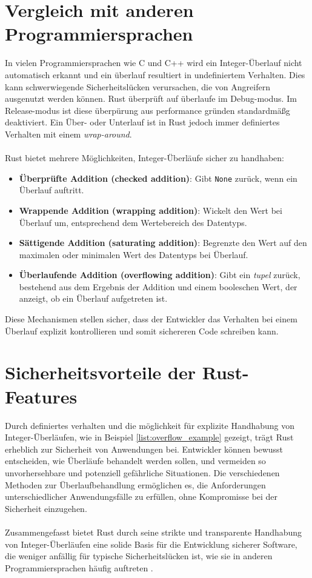 \section{Vergleich mit anderen Programmiersprachen}

In vielen Programmiersprachen wie C und C++ wird ein Integer-Überlauf nicht automatisch erkannt und ein überlauf resultiert in undefiniertem Verhalten. 
Dies kann schwerwiegende Sicherheitslücken verursachen, die von Angreifern ausgenutzt werden können.
Rust überprüft auf überlaufe im Debug-modus.
Im Release-modus ist diese überpürung aus performance gründen standardmäßg deaktiviert.
Ein Über- oder Unterlauf ist in Rust jedoch immer definiertes Verhalten mit einem \textit{\gls{wrap-around}}.\\
\\
Rust bietet mehrere Möglichkeiten, Integer-Überläufe sicher zu handhaben:

\begin{itemize}
    \item \textbf{Überprüfte Addition (checked addition)}: Gibt \texttt{None} zurück, wenn ein Überlauf auftritt.
    \item \textbf{Wrappende Addition (wrapping addition)}: Wickelt den Wert bei Überlauf um, entsprechend dem Wertebereich des Datentyps.
    \item \textbf{Sättigende Addition (saturating addition)}: Begrenzte den Wert auf den maximalen oder minimalen Wert des Datentyps bei Überlauf.
    \item \textbf{Überlaufende Addition (overflowing addition)}: Gibt ein \textit{\gls{tupel}} zurück, bestehend aus dem Ergebnis der Addition und einem booleschen Wert, der anzeigt, ob ein Überlauf aufgetreten ist.
\end{itemize}
\noindent
Diese Mechanismen stellen sicher, dass der Entwickler das Verhalten bei einem Überlauf explizit kontrollieren und somit sichereren Code schreiben kann.

\section{Sicherheitsvorteile der Rust-Features}

Durch definiertes verhalten und die möglichkeit für explizite Handhabung von Integer-Überläufen, wie in Beispiel \ref{list:overflow_example} gezeigt, trägt Rust erheblich zur Sicherheit von Anwendungen bei. 
Entwickler können bewusst entscheiden, wie Überläufe behandelt werden sollen, und vermeiden so unvorhersehbare und potenziell gefährliche Situationen. 
Die verschiedenen Methoden zur Überlaufbehandlung ermöglichen es, die Anforderungen unterschiedlicher Anwendungsfälle zu erfüllen, ohne Kompromisse bei der Sicherheit einzugehen.\\
\\
Zusammengefasst bietet Rust durch seine strikte und transparente Handhabung von Integer-Überläufen eine solide Basis für die Entwicklung sicherer Software, die weniger anfällig für typische Sicherheitslücken ist, wie sie in anderen Programmiersprachen häufig auftreten \cite{tung2020}.

